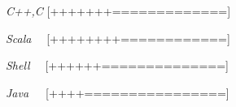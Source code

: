 \begin{cvline}
  \cvsingleline 
    {
      \begin{cvitems}
          \item {\it{C++,C}}  {[+++++++=============]}
          \item {\it{Scala\,\,\,\,\,\,}}  {[++++++++============]}
          \item {\it{Shell\,\,\,\,\,\,}}  {[++++++==============]}
          \item {\it{Java\,\,\,\,\,\,\,}}   {[++++================]}
      \end{cvitems}
    }
\end{cvline}
